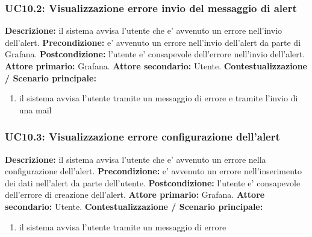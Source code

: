                \subsubsection{UC10.2: Visualizzazione errore invio del messaggio di alert}
                    \textbf{Descrizione:} il sistema avvisa l’utente che e’ avvenuto un errore nell’invio dell’alert.
                    \newline
                    \textbf{Precondizione:} e’ avvenuto un errore nell’invio dell’alert da parte di Grafana.
                    \newline
                    \textbf{Postcondizione:} l’utente e’ consapevole dell’errore nell’invio dell’alert.
                    \newline
                    \textbf{Attore primario:} Grafana.
                    \newline
                    \textbf{Attore secondario:} Utente.
                    \newline
                    \textbf{Contestualizzazione / Scenario principale:} \begin{enumerate}
                            \item il sistema avvisa l’utente tramite un messaggio di errore e tramite l’invio di una mail
                        \end{enumerate}
                        
                \subsubsection{UC10.3: Visualizzazione errore configurazione dell’alert}
                    \textbf{Descrizione:} il sistema avvisa l’utente che e’ avvenuto un errore nella configurazione dell’alert.
                    \newline
                    \textbf{Precondizione:}  e’ avvenuto un errore nell’inserimento dei dati nell’alert da parte dell’utente.
                    \newline
                    \textbf{Postcondizione:} l’utente e’ consapevole dell’errore di creazione dell’alert.
                    \newline
                    \textbf{Attore primario:} Grafana.
                    \newline
                    \textbf{Attore secondario:} Utente.
                    \newline
                    \textbf{Contestualizzazione / Scenario principale:} \begin{enumerate}
                            \item il sistema avvisa l’utente tramite un messaggio di errore
                        \end{enumerate}
